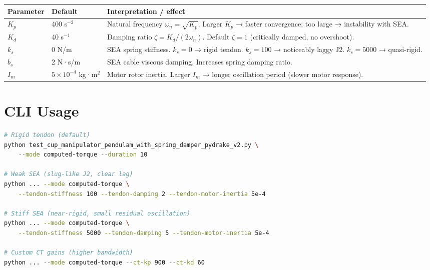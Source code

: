 \documentclass[11pt, a4paper]{article}
\begin{document}
\begin{center}
\begin{tabular}{ll p{7.5cm}}
\toprule
\textbf{Parameter} & \textbf{Default} & \textbf{Interpretation / effect} \\
\midrule
$K_p$ & 400 s$^{-2}$ & Natural frequency $\omega_n = \sqrt{K_p}$.
                        Larger $K_p$ → faster convergence; too large → instability
                        with SEA. \\
$K_d$ & 40 s$^{-1}$  & Damping ratio $\zeta = K_d / (2\omega_n)$.
                        Default $\zeta = 1$ (critically damped, no overshoot). \\
$k_s$ & 0 N/m        & SEA spring stiffness.  $k_s = 0$ → rigid tendon.
                        $k_s = 100$ → noticeably laggy J2.
                        $k_s = 5000$ → quasi-rigid. \\
$b_s$ & 2 N·s/m      & SEA cable viscous damping.  Increases spring damping ratio. \\
$I_m$ & $5{\times}10^{-4}$ kg·m$^2$
                      & Motor rotor inertia.  Larger $I_m$ → longer oscillation
                        period (slower motor response). \\
\bottomrule
\end{tabular}
\end{center}

\section{CLI Usage}

\begin{lstlisting}[language=bash]
# Rigid tendon (default)
python test_cup_manipulator_pendulam_with_spring_damper_pydrake_v2.py \
    --mode computed-torque --duration 10

# Weak SEA (slug-like J2, clear lag)
python ... --mode computed-torque \
    --tendon-stiffness 100 --tendon-damping 2 --tendon-motor-inertia 5e-4

# Stiff SEA (near-rigid, small residual oscillation)
python ... --mode computed-torque \
    --tendon-stiffness 5000 --tendon-damping 5 --tendon-motor-inertia 5e-4

# Custom CT gains (higher bandwidth)
python ... --mode computed-torque --ct-kp 900 --ct-kd 60
\end{lstlisting}
\end{document}
